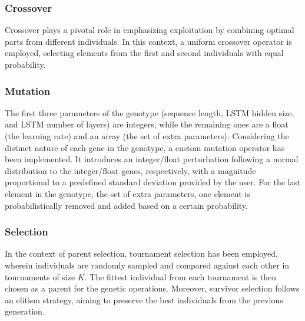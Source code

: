 \subsubsection{Crossover}
Crossover plays a pivotal role in emphasizing exploitation by combining optimal parts from different individuals. In this context, a uniform crossover operator is employed, selecting elements from the first and second individuals with equal probability.\\


\subsubsection{Mutation}
The first three parameters of the genotype (sequence length, LSTM hidden size, and LSTM number of layers) are integers, while the remaining ones are a float (the learning rate) and an array (the set of extra parameters). Considering the distinct nature of each gene in the genotype, a custom mutation operator has been implemented. It introduces an integer/float perturbation following a normal distribution to the integer/float genes, respectively, with a magnitude proportional to a predefined standard deviation provided by the user. For the last element in the genotype, the set of extra parameters, one element is probabilistically removed and added based on a certain probability.\\


\subsubsection{Selection} 
In the context of parent selection, tournament selection has been employed, wherein individuals are randomly sampled and compared against each other in tournaments of size $K$. The fittest individual from each tournament is then chosen as a parent for the genetic operations. Moreover, survivor selection follows an elitism strategy, aiming to preserve the best individuals from the previous generation. \\


